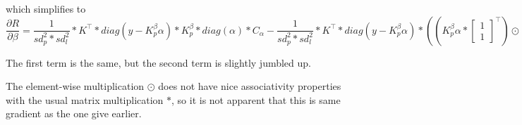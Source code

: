 \documentclass[12pt]{article}
\newcommand{\A}{\alpha}
\newcommand{\B}{\beta}
\begin{document}
which simplifies to
\begin{dmath*}
  \frac{\partial R}{\partial \B} = 
    \frac{1}{sd_p^2 * sd_l ^2} *
    K^\top * diag(y-K_p^\B\A) *
    K_p^\B * diag(\A) * C_\A 
    -\frac{1}{sd_p^2 * sd_l ^2} * K^\top * diag(y-K_p^\B\A) * ((
        K_p^\B\A *
        \begin{bmatrix}
          1\\
          1
        \end{bmatrix}^\top)  \odot 
      (P-K*\B))
\end{dmath*}

The first term is the same, but the second term is slightly jumbled up.

The element-wise multiplication $\odot$ does not have nice associativity properties with the usual matrix multiplication $*$, so it is not apparent that this is same gradient as the one give earlier. 
\end{document}
